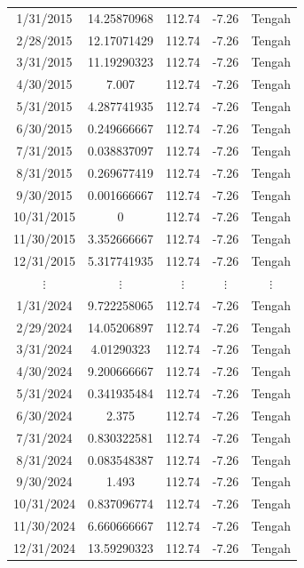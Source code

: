 \begin{longtable}{|c|c|c|c|c|}
    1/31/2015  & 14.25870968  & 112.74 & -7.26 & Tengah \\
    2/28/2015  & 12.17071429  & 112.74 & -7.26 & Tengah \\
    3/31/2015  & 11.19290323  & 112.74 & -7.26 & Tengah \\
    4/30/2015  & 7.007         & 112.74 & -7.26 & Tengah \\
    5/31/2015  & 4.287741935   & 112.74 & -7.26 & Tengah \\
    6/30/2015  & 0.249666667   & 112.74 & -7.26 & Tengah \\
    7/31/2015  & 0.038837097   & 112.74 & -7.26 & Tengah \\
    8/31/2015  & 0.269677419   & 112.74 & -7.26 & Tengah \\
    9/30/2015  & 0.001666667   & 112.74 & -7.26 & Tengah \\
    10/31/2015 & 0             & 112.74 & -7.26 & Tengah \\
    11/30/2015 & 3.352666667   & 112.74 & -7.26 & Tengah \\
    12/31/2015 & 5.317741935   & 112.74 & -7.26 & Tengah \\
    \multicolumn{1}{|c|}{$\vdots$} &
    \multicolumn{1}{c|}{$\vdots$} &
    \multicolumn{1}{c|}{$\vdots$} &
    \multicolumn{1}{c|}{$\vdots$} &
    \multicolumn{1}{c|}{$\vdots$} \\
    1/31/2024  & 9.722258065   & 112.74 & -7.26 & Tengah \\
    2/29/2024  & 14.05206897   & 112.74 & -7.26 & Tengah \\
    3/31/2024  & 4.01290323    & 112.74 & -7.26 & Tengah \\
    4/30/2024  & 9.200666667   & 112.74 & -7.26 & Tengah \\
    5/31/2024  & 0.341935484   & 112.74 & -7.26 & Tengah \\
    6/30/2024  & 2.375         & 112.74 & -7.26 & Tengah \\
    7/31/2024  & 0.830322581   & 112.74 & -7.26 & Tengah \\
    8/31/2024  & 0.083548387   & 112.74 & -7.26 & Tengah \\
    9/30/2024  & 1.493         & 112.74 & -7.26 & Tengah \\
    10/31/2024 & 0.837096774   & 112.74 & -7.26 & Tengah \\
    11/30/2024 & 6.660666667   & 112.74 & -7.26 & Tengah \\
    12/31/2024 & 13.59290323   & 112.74 & -7.26 & Tengah \\

\end{longtable}
